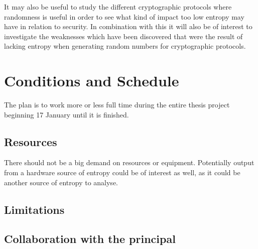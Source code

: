 \documentclass[a4paper,11pt]{report}
\begin{document}
\noindent
It may also be useful to study the different cryptographic protocols 
where randomness is useful in order to see what kind of impact too low entropy 
may have in relation to security. In combination with this it will also be 
of interest to investigate the weaknesses which have been discovered that were 
the result of lacking entropy when generating random numbers for cryptographic 
protocols.




\section*{Conditions and Schedule}
The plan is to work more or less full time during the entire thesis project
beginning 17 January until it is finished.
\subsection*{Resources}
There should not be a big demand on resources or equipment.
Potentially output from a hardware source of entropy could be of interest
as well, as it could be another source of entropy to analyse.
\subsection*{Limitations}
\subsection*{Collaboration with the principal}
\end{document}
